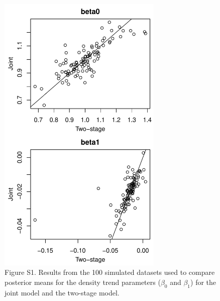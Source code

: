 \documentclass[12pt]{article}
\begin{document}
\begin{figure}[h!]
  \centering
  \includegraphics[width=0.7\textwidth]{sim/sim-betas}
  \caption{Figure S1. Results from the 100 simulated datasets used to
    compare posterior means for the density trend parameters
    ($\beta_0$ and $\beta_1$) for the joint model and 
    the two-stage model. }  
  \label{fig:sim-betas}
\end{figure}
\end{document}
